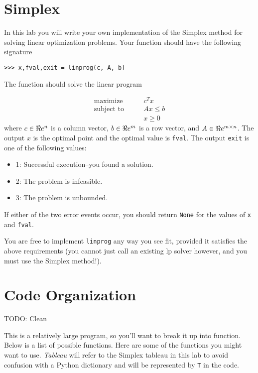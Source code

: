 \label{lab:Simplex}

\section*{Simplex}
In this lab you will write your own implementation of the Simplex method for solving linear optimization problems.
Your function should have the following signature
\begin{lstlisting}
>>> x,fval,exit = linprog(c, A, b)
\end{lstlisting}
The function should solve the linear program

\begin{align*}
\mbox{maximize}\qquad & c^T x \\
\mbox{subject to}\qquad & A x \leq b \\
 & x \geq 0
\end{align*}
where $c \in \Re e^n$ is a column vector, $b \in \Re e^m$ is a row vector, and $A \in \Re e^{m \times n}$.
The output $x$ is the optimal point and the optimal value is {\tt fval}.
The output {\tt exit} is one of the following values:
\begin{itemize}
	\item 1: Successful execution--you found a solution.
	\item 2: The problem is infeasible.
	\item 3: The problem is unbounded.
\end{itemize}
If either of the two error events occur, you should return {\tt None} for the values of {\tt x} and {\tt fval}.

You are free to implement {\tt linprog} any way you see fit, provided it satisfies the above requirements (you cannot just call an existing lp solver however, and you must use the Simplex method!).

\section*{Code Organization}
TODO: Clean

This is a relatively large program, so you'll want to break it up into function.
Below is a list of possible functions.
Here are some of the functions you might want to use.
\emph{Tableau} will refer to the Simplex tableau in this lab to avoid confusion with a Python dictionary and will be represented by {\tt T}  in the code.

